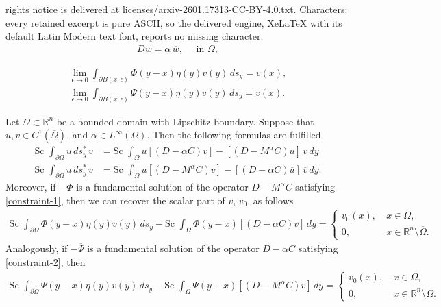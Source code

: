 \documentclass[10pt,a4paper]{amsart}
\def\R{\mathbb{R}}
\def\Sc{\mbox{Sc}\,}
\begin{document}
rights notice is delivered at licenses/arxiv-2601.17313-CC-BY-4.0.txt. Characters: every retained excerpt is pure ASCII, so the delivered engine, XeLaTeX with its default Latin Modern text font, reports no missing character.
\begin{align}\label{eq:Vekua_equation}
   D w=\alpha\, \overline{w}, \quad \text{ in }\Omega,
\end{align}

\begin{align}\label{constraint-1}
   \lim_{\epsilon\rightarrow 0} \int_{\partial B(x;\epsilon)} \Phi(y-x)\eta(y)v(y)\, ds_y=v(x),\\
   \lim_{\epsilon\rightarrow 0} \int_{\partial B(x;\epsilon)} \Psi(y-x)\eta(y)v(y)\, ds_y=v(x).\label{constraint-2}
\end{align}

\begin{theorem}\label{th:Cauchy-theorem}
 Let $\Omega\subset \mathbb{R}^n$ be a bounded domain with Lipschitz boundary. Suppose that $ u, v\in C^1(\overline{\Omega})$, and $\alpha\in L^{\infty}(\Omega)$. Then the following formulas are fulfilled
\begin{align}
   \text{Sc }\int_{\partial\Omega} u\, ds_y^* \, v&=\text{Sc }\int_{\Omega} u [ (D-\alpha C)v]-
   [(D-M^{\alpha}C)\overline{u}]\, \overline{v} \, dy\label{eq:integral-formula-1}\\
   \text{Sc }\int_{\partial\Omega} u\, ds_y^* \, v&=\text{Sc }\int_{\Omega} u [(D-M^{\alpha}C)v]-
   [(D-\alpha C)\overline{u}]\, \overline{v}\, dy.\label{eq:integral-formula-2}
\end{align}
Moreover, if $-\overline{\Phi}$ is a fundamental solution of the operator $D-M^{\alpha}C$ satisfying \eqref{constraint-1}, then we can recover the scalar part of $v$, $v_0$, as follows
\begin{align}\label{eq:scalar-BP}
\Sc\, \int_{\partial\Omega}\Phi(y-x) \eta(y) v(y)\, ds_{y}-\Sc\, \int_{\Omega} \Phi(y-x) [ (D-\alpha C)v] \, dy=\left\{
   \begin{array}{ll}
      v_0(x), \ & x\in \Omega,\\
      0,           & x\in \R^n\setminus \overline{\Omega}.
   \end{array}
\right. 
\end{align}
Analogously,  if $-\overline{\Psi}$ is a fundamental solution of the operator $D-\alpha C$ satisfying \eqref{constraint-2}, then 
\begin{align}\label{eq:scalar-BP-2}
  \Sc\, \int_{\partial\Omega}\Psi(y-x) \eta(y) v(y)\, ds_{y}-\Sc\, \int_{\Omega} \Psi(y-x) [ (D-M^{\alpha} C)v] \, dy=\left\{
   \begin{array}{ll}
      v_0(x), \ & x\in \Omega,\\
      0,           & x\in \R^n\setminus \overline{\Omega}.
   \end{array}
\right. 
\end{align}
\end{theorem}
\end{document}
